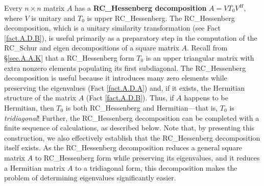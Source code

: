 Every $n\times n$ matrix $A$ has a {\bf RC_Hessenberg decomposition} $A=V
T_0 V^{H}$, where $V$ is unitary and $T_0$ is upper RC_Hessenberg.  The
RC_Hessenberg decomposition, which is a unitary similarity transformation (see Fact \ref{fact.A.D.B}), is useful primarily as a preparatory
step in the computation of the RC_Schur and eigen decompositions of
a square matrix $A$.  Recall from \S \ref{sec.A.A.K} that a
RC_Hessenberg form $T_0$ is an upper triangular matrix with extra
nonzero elements populating its first subdiagonal.  The RC_Hessenberg
decomposition is useful because it introduces many zero elements while
preserving the eigenvalues (Fact \ref{fact.A.D.A}) and, if it exists,
the Hermitian structure of the matrix $A$ (Fact \ref{fact.A.D.B}).
Thus, if $A$ happens to be Hermitian, then $T_0$ is both RC_Hessenberg
and Hermitian---that is, $T_0$ is {\it tridiagonal\/}!  Further, the
RC_Hessenberg decomposition can be completed with a finite
sequence of calculations, as described below.  Note that, by
presenting this construction, we also effectively establish that the
RC_Hessenberg decomposition itself exists.  As the RC_Hessenberg
decomposition reduces a general square matrix $A$ to RC_Hessenberg form while preserving its eigenvalues, and it reduces a Hermitian
matrix $A$ to a tridiagonal form, this decomposition makes the problem of determining eigenvalues significantly easier.

\begin{figure*}[t]
\end{figure*}

